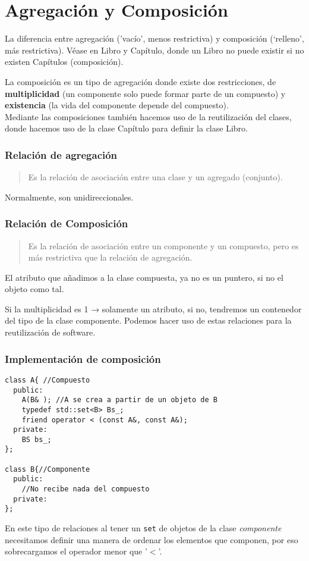 \chapter{Agregación y Composición}
La diferencia entre agregación (’vacío’, menos restrictiva) y composición (‘relleno’, más restrictiva).
Véase en Libro y Capítulo, donde un Libro no puede existir si no existen Capítulos (composición).

La composición es un tipo de agregación donde existe dos restricciones, de \textbf{multiplicidad} (un componente solo puede formar parte de un compuesto) y \textbf{existencia} (la vida del componente depende del compuesto).\\
Mediante las composiciones también hacemos uso de la reutilización del clases, donde hacemos uso de la clase Capítulo para definir la clase Libro.
\vspace{-0.5cm}
\subsection{Relación de agregación}
\begin{quote}
	Es la relación de asociación entre una clase y un agregado (conjunto).
\end{quote}
Normalmente, son unidireccionales.
\vspace{-0.5cm}
\subsection{Relación de Composición}
\begin{quote}
	Es la relación de asociación entre un componente y un compuesto, pero es más restrictiva que la relación de agregación.
\end{quote}
El atributo que añadimos a la clase compuesta, ya no es un puntero, si no el objeto como tal.

Si la multiplicidad es 1 → solamente un atributo, si no, tendremos un contenedor del tipo de la clase componente.
Podemos hacer uso de estas relaciones para la reutilización de software.
\subsection{ Implementación de composición}
\begin{center}
	\begin{lstlisting}[frame=single]
class A{ //Compuesto
  public:
  	A(B& ); //A se crea a partir de un objeto de B
    typedef std::set<B> Bs_;
    friend operator < (const A&, const A&);
  private:
    BS bs_;
};

class B{//Componente
  public:
    //No recibe nada del compuesto
  private:
};
\end{lstlisting}
\end{center}
En este tipo de relaciones al tener un \texttt{set} de objetos de la clase \textit{componente} necesitamos definir una manera de ordenar los elementos que componen, por eso sobrecargamos el operador menor que '$<$'.